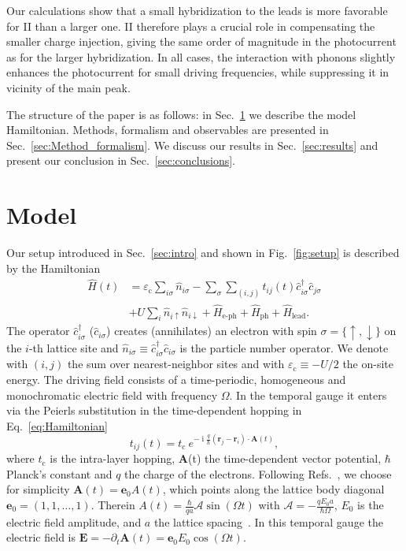 \documentclass[aps,prb,groupedaddress,showpacs,twocolumn,superscriptaddress,10pt]{revtex4-2}
\DeclareMathOperator*{\ii}{i} %
\renewcommand{\vec}[1]{\bm{#1}} %
\newcommand{\aamp}{\mathcal{A}}
\begin{document}
Our calculations show that a small hybridization to the leads is more favorable for II than a larger one. II therefore plays a crucial role in compensating the smaller charge injection, giving the same order of magnitude in the photocurrent as for the larger hybridization.
In all cases, the interaction with phonons slightly enhances the photocurrent for small driving frequencies, while suppressing it in vicinity of the main peak.

The structure of the paper is as follows: in Sec.~\ref{sec:Model} we describe the model Hamiltonian. Methods, formalism and observables are presented in Sec.~\ref{sec:Method_formalism}. We discuss our results in Sec.~\ref{sec:results} and present our conclusion in Sec.~\ref{sec:conclusions}. 

\section{Model}
\label{sec:Model}

Our setup introduced in Sec.~\ref{sec:intro} and shown in Fig.~\ref{fig:setup} is described by the Hamiltonian
%
\begin{equation}
\label{eq:Hamiltonian}
\begin{split} 
\hat{H}(t)&=\varepsilon_{\text{c}} \sum_{i\sigma}\hat{n}_{i\sigma} -\sum_{\sigma}\sum_{(i,j)} t_{ij}(t) \hat{c}^{\dagger}_{i\sigma} \hat{c}_{j\sigma}
\\ & + U \sum_{i} \hat{n}_{i\uparrow} \hat{n}_{i\downarrow}+\hat{H}_{\text{e-ph}} + \hat{H}_{\text{ph}}+\hat{H}_{\text{lead}}.
\end{split}
\end{equation}
% 
The operator $\hat{c}^{\dagger}_{i\sigma}$ ($\hat{c}_{i\sigma}$) creates (annihilates) an electron with spin $\sigma= \lbrace \uparrow,\downarrow \rbrace$ on the $i$-th lattice site and $\hat{n}_{i\sigma}\equiv \hat{c}^{\dagger}_{i\sigma} \hat{c}_{i\sigma}$ is the particle number operator. We denote with $(i,j)$ the sum over nearest-neighbor sites and with $\varepsilon_{\text{c}} \equiv -U/2$ the on-site energy. The driving field consists of a time-periodic, homogeneous and monochromatic electric field with frequency $\Omega$. In the temporal gauge it enters via the Peierls substitution in the time-dependent hopping in Eq.~\eqref{eq:Hamiltonian}~\cite{peie.33}
% 
\begin{equation}\label{eq:peierls} 
t_{ij}(t) = t_{\text{c}} \ e^{-\ii \frac{q}{\hbar} \left( \vec{r}_j - \vec{r}_i \right) \cdot \vec{A}(t)}, 
\end{equation}
% 
where $t_{\text{c}}$ is the intra-layer hopping, $\vec{A}$(t) the time-dependent vector potential, $\hbar$ Planck's constant and $q$ the charge of the electrons. Following Refs.~\cite{ts.ok.08,mu.we.18}, we choose for simplicity $\vec{A}(t)=\vec{e}_{0} A(t)$, which points along the lattice body diagonal $\vec{e}_{0}=(1,1,\dots,1)$. Therein $A(t)=\frac{\hbar}{qa}\aamp\sin(\Omega t)$ with $\aamp=-\frac{qE_0a}{\hbar\Omega}$, $E_0$ is the electric field amplitude, and $a$ the lattice spacing~\cite{ts.ok.08}. 
In this temporal gauge the electric field is $\vec{E}= -\partial_{t}\vec{A}(t) = \vec{e}_{0}E_0 \cos(\Omega t)$.
\end{document}
